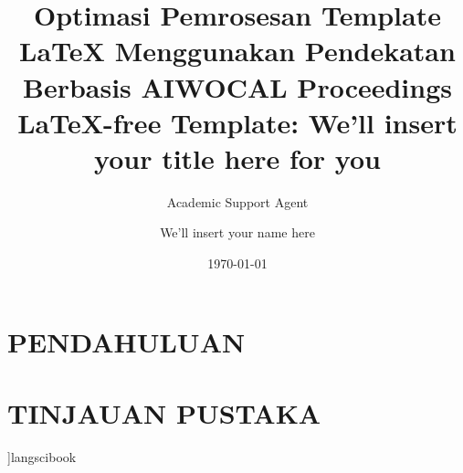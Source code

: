 \documentclass{langscibook}
\title{Optimasi Pemrosesan Template LaTeX Menggunakan Pendekatan Berbasis AI}
\author{Academic Support Agent}
\date{\today}
\begin{document}
\maketitle

\begin{abstract}

\end{abstract}

\chapter{PENDAHULUAN}


\chapter{TINJAUAN PUSTAKA}


]{langscibook}


\author{We'll insert your name here}

\title{WOCAL Proceedings LaTeX-free Template: We'll insert your title here for you}  




%   
%    
\end{document}
